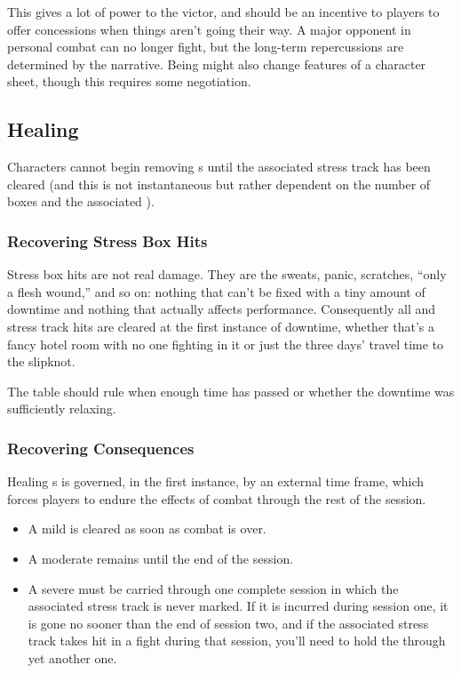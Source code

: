 This gives a lot of power to the victor, and should be an incentive to players to offer concessions when things aren't going their way. A major opponent \TakenOut{} in personal combat can no longer fight, but the long-term repercussions are determined by the narrative. Being \TakenOut{} might also change features of a character sheet, though this requires some negotiation.

\subsection{Healing}
\label{sec:personal-combat-healing}

Characters cannot begin removing \Consequence{}s until the associated stress track has been cleared (and this is not instantaneous but rather dependent on the number of boxes and the associated \Skill{}).

\subsubsection{Recovering Stress Box Hits}

Stress box hits are not real damage. They are the sweats, panic, scratches, ``only a flesh wound,'' and so on: nothing that can't be fixed with a tiny amount of downtime and nothing that actually affects performance. Consequently all \Health{} and \Composure{} stress track hits are cleared at the first instance of downtime, whether that's a fancy hotel room with no one fighting in it or just the three days' travel time to the slipknot.

 The table should rule when enough time has passed or whether the downtime was sufficiently relaxing.



\subsubsection{Recovering Consequences}

Healing \Consequence{}s is governed, in the first instance, by an external time frame, which forces players to endure the effects of combat through the rest of the session.
\begin{itemize}
\item A mild \Consequence{} is cleared as soon as combat is over.
\item A moderate \Consequence{} remains until the end of the session.
\item A severe \Consequence{} must be carried through one complete session in which the associated stress track is never marked. If it is incurred during session one, it is gone no sooner than the end of session two, and if the associated stress track takes hit in a fight during that session, you'll need to hold the \Consequence{} through yet another one.
\end{itemize}

